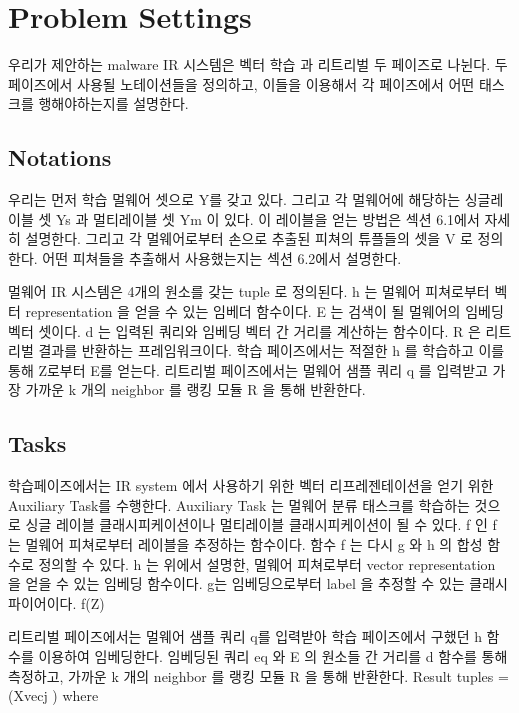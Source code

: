 \section{Problem Settings}

우리가 제안하는 malware IR 시스템은 벡터 학습 과 리트리벌 두 페이즈로 나뉜다. 두 페이즈에서 사용될 노테이션들을 정의하고, 이들을 이용해서 각 페이즈에서 어떤 태스크를 행해야하는지를 설명한다. 

\subsection{Notations}

우리는 먼저 학습 멀웨어 셋으로 Y를 갖고 있다. 그리고 각 멀웨어에 해당하는 싱글레이블 셋  Ys 과 멀티레이블 셋 Ym 이 있다. 이 레이블을 얻는 방법은 섹션 6.1에서 자세히 설명한다. 그리고 각 멀웨어로부터 손으로 추출된 피쳐의 튜플들의 셋을 V 로 정의한다. 어떤 피쳐들을 추출해서 사용했는지는 섹션 6.2에서 설명한다. 

멀웨어 IR 시스템은  4개의 원소를 갖는 tuple 로 정의된다. h 는 멀웨어 피쳐로부터 벡터 representation 을 얻을 수 있는 임베더 함수이다. E 는 검색이 될 멀웨어의 임베딩 벡터 셋이다. d 는 입력된 쿼리와 임베딩 벡터 간 거리를 계산하는 함수이다. R 은 리트리벌 결과를 반환하는 프레임워크이다. 학습 페이즈에서는 적절한 h 를 학습하고 이를 통해 Z로부터 E를 얻는다. 리트리벌 페이즈에서는 멀웨어 샘플 쿼리 q 를 입력받고 가장 가까운 k 개의 neighbor 를 랭킹 모듈 R 을 통해 반환한다.


\subsection{Tasks}

학습페이즈에서는 IR system 에서 사용하기 위한 벡터 리프레젠테이션을 얻기 위한 Auxiliary Task를 수행한다. Auxiliary Task 는 멀웨어 분류 태스크를 학습하는 것으로 싱글 레이블 클래시피케이션이나 멀티레이블 클래시피케이션이 될 수 있다. f 인 f 는 멀웨어 피쳐로부터 레이블을 추정하는 함수이다. 함수 f 는 다시 g 와 h 의 합성 함수로 정의할 수 있다. h 는 위에서 설명한, 멀웨어 피쳐로부터 vector representation 을 얻을 수 있는 임베딩 함수이다. g는 임베딩으로부터 label 을 추정할 수 있는 클래시파이어이다.  
f(Z)

리트리벌 페이즈에서는 멀웨어 샘플 쿼리 q를 입력받아 학습 페이즈에서 구했던 h 함수를 이용하여 임베딩한다. 임베딩된 쿼리 eq 와 E 의 원소들 간 거리를 d 함수를 통해 측정하고, 가까운 k 개의 neighbor 를 랭킹 모듈 R 을 통해 반환한다. 
Result tuples = (Xvecj ) where


